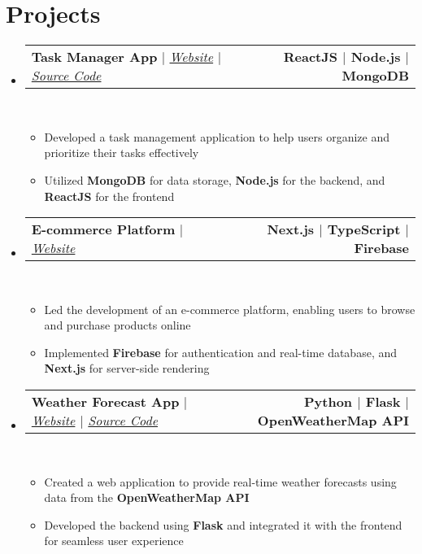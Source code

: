 \documentclass[letterpaper,11pt]{article}
\makeatletter
\newcommand{\resumeItem}[1]{
  \item\small{
    {#1 \vspace{0pt}}
  }
}
\newcommand{\resumeProjectHeading}[2]{
    \item
    \begin{tabular*}{1.001\textwidth}{l@{\extracolsep{\fill}}r}
      \small#1 & \textbf{\small #2}\\
    \end{tabular*}\vspace{-7pt}
}
\newcommand{\resumeSubHeadingListStart}{\begin{itemize}[leftmargin=0.0in, label={}]}
\newcommand{\resumeSubHeadingListEnd}{\end{itemize}}\vspace{0pt}
\newcommand{\resumeItemListStart}{\begin{itemize}}
\newcommand{\resumeItemListEnd}{\end{itemize}\vspace{-5pt}}
\makeatother
\begin{document}
\section{Projects} 
    \vspace{-5pt}
    \resumeSubHeadingListStart
    \resumeProjectHeading
            {\textbf{{Task Manager App}} $|$ \emph{\href{https://taskmanagerapp.vercel.app/}{Website}{ $|$ }\href{https://github.com/johndoe/task-manager-app}{Source Code}}}{ReactJS $|$ Node.js $|$ MongoDB}
            \\[5mm]
          \resumeItemListStart
            \resumeItem{Developed a task management application to help users organize and prioritize their tasks effectively}
            \resumeItem{Utilized \textbf{MongoDB} for data storage, \textbf{Node.js} for the backend, and \textbf{ReactJS} for the frontend}
          \resumeItemListEnd
 \vspace{-20pt}
 \resumeProjectHeading
            {\textbf{{E-commerce Platform}} $|$ \emph{\href{https://ecommerceplatform.vercel.app/}{Website}}}{Next.js $|$ TypeScript $|$ Firebase}
            \\[5mm]
          \resumeItemListStart
            \resumeItem{Led the development of an e-commerce platform, enabling users to browse and purchase products online}
            \resumeItem{Implemented \textbf{Firebase} for authentication and real-time database, and \textbf{Next.js} for server-side rendering}
          \resumeItemListEnd
 \vspace{-17pt}
 \resumeProjectHeading
{\textbf{{Weather Forecast App}} $|$ \emph{\href{https://weatherforecastapp.vercel.app/}{Website}{ $|$ }\href{https://github.com/johndoe/weather-forecast-app}{Source Code}}}{Python $|$ Flask $|$ OpenWeatherMap API}
\\[5mm]
\resumeItemListStart
\resumeItem{Created a web application to provide real-time weather forecasts using data from the \textbf{OpenWeatherMap API}}
\resumeItem{Developed the backend using \textbf{Flask} and integrated it with the frontend for seamless user experience}
\resumeItemListEnd

\resumeSubHeadingListEnd
\vspace{-28pt}
\end{document}
